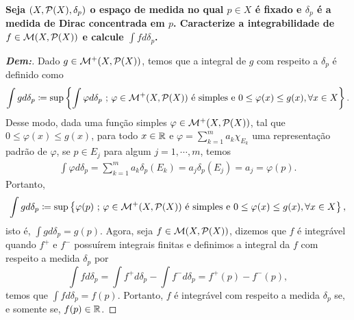 \biglinend 
\newpage
{}
\myexe{\thetres}
\bigline
\textbf{Seja $(X, \mathcal P (X), \delta_p)$ o espaço de medida no 
qual $p \in X$ é fixado e $\delta_p$ é a medida de Dirac concentrada em $p$. 
Caracterize a integrabilidade de $f \in \mathcal M(X, \mathcal P(X))$ 
e calcule $\int f d\delta_p$.}
\begin{proof}[\textbf{Dem:}] Dado $g \in \mathcal M^+(X, \mathcal P(X))$, temos que 
  a integral de $g$ com respeito a $\delta_p$ é definido como 
\begin{align*}
  \int g d\delta_p \coloneq \sup \left\{\int 
  \varphi d\delta_p \text{ ; } \varphi \in \mathcal M^+(X, \mathcal P(X))
  \text{ é simples e } 0 \le \varphi(x) \le g(x), \forall x\in X\right\}.
\end{align*}
Desse modo, dada uma função simples $\varphi \in \mathcal M^+(X, \mathcal P(X))$, 
  tal que $0 \le \varphi(x) \le g(x)$, para todo $x \in \mathbb R$ 
  e $\varphi = \sum_{k=1}^m a_k \chi_{E_k}$ uma representação padrão de $\varphi$,
  se $p \in E_j$ para algum $j = 1, \cdots, m$, temos
\begin{align*}
  \int \varphi d\delta_p = \sum_{k=1}^m a_k \delta_p(E_k) 
  = a_j \delta_p(E_j) = a_j = \varphi(p).
\end{align*}
Portanto, 
\begin{align*}
  \int g d\delta_p \coloneq \sup \left\{\varphi(p) \text{ ; } \varphi \in \mathcal M^+(X, \mathcal P(X))
  \text{ é simples e } 0 \le \varphi(x) \le g(x), \forall x\in X\right\}, 
\end{align*}
  isto é, $\int g d\delta_p = g(p)$. 
  Agora, seja $f \in \mathcal M(X, \mathcal P(X))$, dizemos que $f$ 
  é integrável quando $f^+$ e $f^-$ possuírem integrais finitas e definimos a integral 
  da $f$ com respeito a medida $\delta_p$ por 
  $$\int f d\delta_p = \int f^+d\delta_p - \int f^- d\delta_p = f^+(p) - f^-(p),$$
  temos que $\int f d\delta_p = f(p)$. Portanto, $f$ é integrável com 
  respeito a medida $\delta_p$ se, e somente se, $f(p) \in \mathbb R$.
\end{proof}

